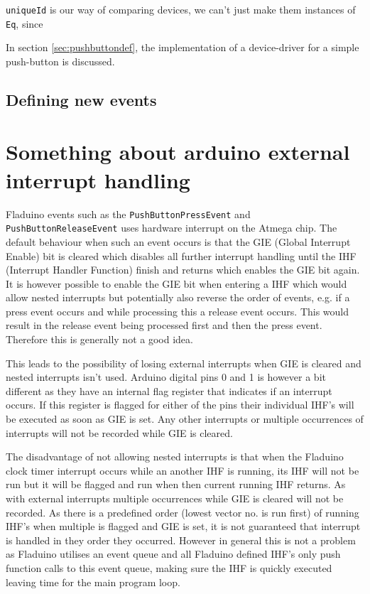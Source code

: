 \documentclass[a4paper, oneside, final]{memoir}
\begin{document}
\texttt{uniqueId} is our way of comparing devices, we can't just make
them instances of \texttt{Eq}, since

In section \ref{sec:pushbuttondef}, the implementation of a
device-driver for a simple push-button is discussed.


\subsection{Defining new events}
\label{sec:definingevents}



\section{Something about arduino external interrupt handling}

Fladuino events such as the \texttt{PushButtonPressEvent} and
\texttt{PushButtonReleaseEvent} uses hardware interrupt on the Atmega chip. The
default behaviour when such an event occurs is that the GIE (Global Interrupt
Enable) bit is cleared which disables all further interrupt handling until the
IHF (Interrupt Handler Function) finish and returns which enables the GIE bit
again. It is however possible to enable the GIE bit when entering a IHF which
would allow nested interrupts \cite[Section 4.7 page 14]{atmel8p} but
potentially also reverse the order of events, e.g. if a press event occurs and
while processing this a release event occurs. This would result in the release
event being processed first and then the press event. Therefore this is
generally not a good idea.

This leads to the possibility of losing external interrupts when GIE is cleared and
nested interrupts isn't used. Arduino digital pins 0 and 1 is however a bit
different as they have an internal flag register that indicates if an interrupt
occurs. If this register is flagged for either of the pins their individual
IHF's will be executed as soon as GIE is set. Any other interrupts or multiple
occurrences of interrupts will not be recorded while GIE is cleared.

The disadvantage of not allowing nested interrupts is that when the Fladuino
clock timer interrupt occurs while an another IHF is running, its IHF will not
be run but it will be flagged and run when then current running IHF returns. As
with external interrupts multiple occurrences while GIE is cleared will not be
recorded. As there is a predefined order \cite[Section 9 page 57]{atmel8p}
(lowest vector no. is run first) of running IHF's when multiple is flagged and
GIE is set, it is not guaranteed that interrupt is handled in they order they
occurred. However in general this is not a problem as Fladuino utilises an event
queue and all Fladuino defined IHF's only push function calls to this event
queue, making sure the IHF is quickly executed leaving time for the main program
loop.
\end{document}

